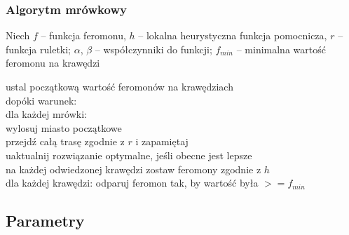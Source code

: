 \documentclass{beamer}
\begin{document}
\begin{frame}
\frametitle{Algorytm mrówkowy}
\iffalse 
\item Każda mrówka po danej iteracji zostawia na krawędziach feromon o wartości f \\
\item Z funckją feromonu jest związany współczynnik $\alpha$, który mówi nam jak bardzo mrówki będą w swoich wyborach uwzględniać wartość feromonu na krawędziach. \\
\item Funkcja ruletki jest wykorzystywana do wyboru kolejnego miasta do odwiedzenia na trasie.\\
\item Współczynnik parowania - stała z przedziału $(0,1)$ \\
\item Minimalna ilość feromonu na krawędzi - zabezpieczenie przed utratą danych o danej krawędzi \\
\item Liczba mrówek - wybierana na początku \\
\fi

Niech $f$ -- funkcja feromonu, $h$ -- lokalna heurystyczna funkcja pomocnicza, $r$ -- funkcja ruletki; $\alpha$, $\beta$ -- współczynniki do funkcji; $f_{min}$ -- minimalna wartość feromonu na krawędzi

ustal początkową wartość feromonów na krawędziach \\
dopóki warunek: \\
  dla każdej mrówki: \\
    wylosuj miasto początkowe \\
    przejdź całą trasę zgodnie z $r$ i zapamiętaj \\
    uaktualnij rozwiązanie optymalne, jeśli obecne jest lepsze \\
    na każdej odwiedzonej krawędzi zostaw feromony zgodnie z $h$ \\
  dla każdej krawędzi:
    odparuj feromon tak, by wartość była $>= f_{min}$


\end{frame}

\subsection{Parametry}
\end{document}
